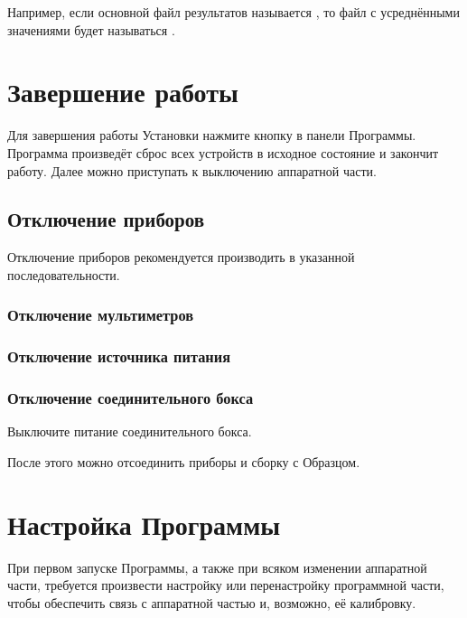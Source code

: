 \documentclass[12pt, a4paper, twocolumn]{report}
\begin{document}
Например, если основной файл результатов называется , то файл с усреднёнными значениями будет называться .

\chapter{Завершение работы}

Для завершения работы Установки нажмите кнопку  в панели Программы. Программа произведёт сброс всех устройств в исходное состояние и закончит работу. Далее можно приступать к выключению аппаратной части.

\section{Отключение приборов}

Отключение приборов рекомендуется производить в указанной последовательности.

\subsection{Отключение мультиметров}



\subsection{Отключение источника питания}



\subsection{Отключение соединительного бокса}

Выключите питание соединительного бокса.

\bigskip

После этого можно отсоединить приборы и сборку с Образцом.

\chapter{Настройка Программы}

При первом запуске Программы, а также при всяком изменении аппаратной части, требуется произвести настройку или перенастройку программной части, чтобы обеспечить связь с аппаратной частью и, возможно, её калибровку.
\end{document}
